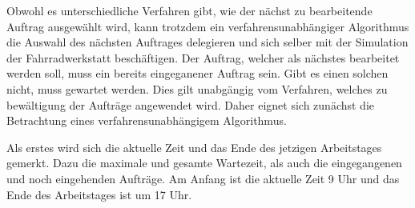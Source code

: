 \documentclass[a4paper,10pt,ngerman]{scrartcl}
\begin{document}
Obwohl es unterschiedliche Verfahren gibt, wie der nächst zu bearbeitende Auftrag ausgewählt wird,
kann trotzdem ein verfahrensunabhängiger Algorithmus die Auswahl des nächsten Auftrages delegieren
und sich selber mit der Simulation der Fahrradwerkstatt beschäftigen.
Der Auftrag, welcher als nächstes bearbeitet werden soll, muss ein bereits eingeganener Auftrag sein.
Gibt es einen solchen nicht, muss gewartet werden.
Dies gilt unabgängig vom Verfahren, welches zu bewältigung der Aufträge angewendet wird.
Daher eignet sich zunächst die Betrachtung eines verfahrensunabhängigem Algorithmus.

Als erstes wird sich die aktuelle Zeit und das Ende des jetzigen Arbeitstages gemerkt.
Dazu die maximale und gesamte Wartezeit, als auch die eingegangenen und noch eingehenden Aufträge.
Am Anfang ist die aktuelle Zeit 9 Uhr und das Ende des Arbeitstages ist um 17 Uhr.
\end{document}
